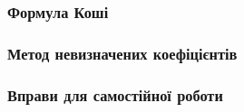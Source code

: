 \documentclass[a4paper, 12pt]{article}
\theoremstyle{definition}
\numberwithin{equation}{section}%
\numberwithin{equation}{subsection}
\begin{document}


\subsubsection{Формула Коші \todo}



\subsubsection{Метод невизначених коефіцієнтів \todo}



\subsubsection{Вправи для самостійної роботи \todo}



\newpage

\nocite{*}




\end{document}
